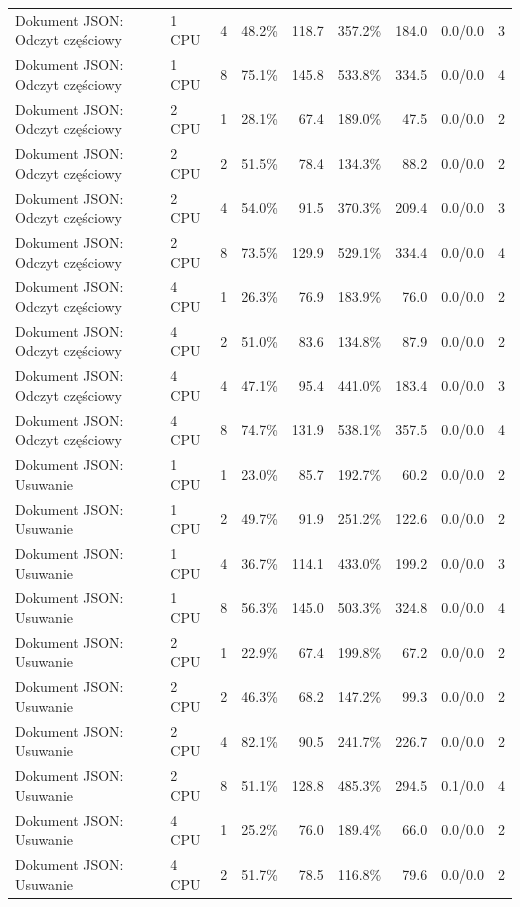 \begin{table}[ht]
{\begin{tabular}{llcrrrrcc}
Dokument JSON: Odczyt częściowy & 1 CPU & 4 & 48.2\% & 118.7 & 357.2\% & 184.0 & 0.0/0.0 & 3 \\
Dokument JSON: Odczyt częściowy & 1 CPU & 8 & 75.1\% & 145.8 & 533.8\% & 334.5 & 0.0/0.0 & 4 \\
Dokument JSON: Odczyt częściowy & 2 CPU & 1 & 28.1\% & 67.4 & 189.0\% & 47.5 & 0.0/0.0 & 2 \\
Dokument JSON: Odczyt częściowy & 2 CPU & 2 & 51.5\% & 78.4 & 134.3\% & 88.2 & 0.0/0.0 & 2 \\
Dokument JSON: Odczyt częściowy & 2 CPU & 4 & 54.0\% & 91.5 & 370.3\% & 209.4 & 0.0/0.0 & 3 \\
Dokument JSON: Odczyt częściowy & 2 CPU & 8 & 73.5\% & 129.9 & 529.1\% & 334.4 & 0.0/0.0 & 4 \\
Dokument JSON: Odczyt częściowy & 4 CPU & 1 & 26.3\% & 76.9 & 183.9\% & 76.0 & 0.0/0.0 & 2 \\
Dokument JSON: Odczyt częściowy & 4 CPU & 2 & 51.0\% & 83.6 & 134.8\% & 87.9 & 0.0/0.0 & 2 \\
Dokument JSON: Odczyt częściowy & 4 CPU & 4 & 47.1\% & 95.4 & 441.0\% & 183.4 & 0.0/0.0 & 3 \\
Dokument JSON: Odczyt częściowy & 4 CPU & 8 & 74.7\% & 131.9 & 538.1\% & 357.5 & 0.0/0.0 & 4 \\
Dokument JSON: Usuwanie & 1 CPU & 1 & 23.0\% & 85.7 & 192.7\% & 60.2 & 0.0/0.0 & 2 \\
Dokument JSON: Usuwanie & 1 CPU & 2 & 49.7\% & 91.9 & 251.2\% & 122.6 & 0.0/0.0 & 2 \\
Dokument JSON: Usuwanie & 1 CPU & 4 & 36.7\% & 114.1 & 433.0\% & 199.2 & 0.0/0.0 & 3 \\
Dokument JSON: Usuwanie & 1 CPU & 8 & 56.3\% & 145.0 & 503.3\% & 324.8 & 0.0/0.0 & 4 \\
Dokument JSON: Usuwanie & 2 CPU & 1 & 22.9\% & 67.4 & 199.8\% & 67.2 & 0.0/0.0 & 2 \\
Dokument JSON: Usuwanie & 2 CPU & 2 & 46.3\% & 68.2 & 147.2\% & 99.3 & 0.0/0.0 & 2 \\
Dokument JSON: Usuwanie & 2 CPU & 4 & 82.1\% & 90.5 & 241.7\% & 226.7 & 0.0/0.0 & 2 \\
Dokument JSON: Usuwanie & 2 CPU & 8 & 51.1\% & 128.8 & 485.3\% & 294.5 & 0.1/0.0 & 4 \\
Dokument JSON: Usuwanie & 4 CPU & 1 & 25.2\% & 76.0 & 189.4\% & 66.0 & 0.0/0.0 & 2 \\
Dokument JSON: Usuwanie & 4 CPU & 2 & 51.7\% & 78.5 & 116.8\% & 79.6 & 0.0/0.0 & 2 \\

\end{tabular}}
\end{table}
